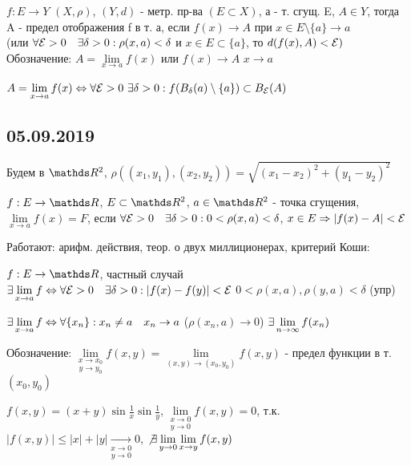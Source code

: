 \documentclass[11pt]{article}
\begin{document}
\begin{definition}
    $f:E \rightarrow Y$ $(X, \rho)$, $(Y,d)$ - метр. пр-ва $(E \subset X)$, а - т. сгущ. E, $A \in Y$, тогда A - предел отображения f в т. а, если $f(x) \rightarrow A$ при $x \in E \setminus \{a\}\rightarrow a$\\
    (или $\forall \mathcal{E}>0 \quad \exists \delta>0: \rho(x,a)<\delta$ и $x \in E \subset \{a\}$, то $d(f(x),A) < \mathcal{E})$\\
    Обозначение: $A=\lim\limits_{x \rightarrow a} f(x)$ или $f(x) \rightarrow A$ $x \rightarrow a$
\end{definition}

\begin{comments}
    $A=\lim\limits_{x \rightarrow a} f(x) \Leftrightarrow \forall \mathcal{E} > 0 \ \exists \delta>0: f(B_\delta(a) \setminus \{a\}) \subset B_{\mathcal{E}} (A)$
\end{comments}

\newpage
\subsection{05.09.2019}
Будем в $\R^2$, $\rho((x_1,y_1), (x_2,y_2)) = \sqrt{(x_1-x_2)^2 + (y_1-y_2)^2}$
\begin{definition}
    $f: E \rightarrow \R$, $E \subset \R^2$, $a \in \R^2$ - точка сгущения, $\lim\limits_{x \rightarrow a} f(x) = F$, если $\forall \mathcal{E}>0 \quad \exists \delta>0: 0<\rho(x,a)<\delta$, $x \in E \Rightarrow |f(x)-A|<\mathcal{E}$ 
\end{definition}

Работают: арифм. действия, теор. о двух миллиционерах, критерий Коши:
\begin{definition}
    $f: E \rightarrow \R$, частный случай $\exists \lim\limits_{x \rightarrow a} f \Leftrightarrow \forall \mathcal{E}>0 \quad \exists \delta > 0: |f(x)-f(y)|<\mathcal{E}$ $0<\rho(x,a), \rho(y,a)<\delta$ (упр)
\end{definition}

\begin{exercise}
    $\exists \lim\limits_{x \rightarrow a} f \Leftrightarrow \forall \{x_n\}: x_n \neq a \quad x_n \rightarrow a$ ($\rho(x_n,a) \rightarrow 0$) $\exists \lim\limits_{n \rightarrow \infty} f(x_n)$
\end{exercise}

Обозначение: $\underset{y \rightarrow y_0}{\lim\limits_{x \rightarrow x_0}} f(x,y) = \lim\limits_{(x,y) \rightarrow (x_0,y_0)} f(x,y)$ - предел функции в т. $(x_0,y_0)$

\begin{instance}
    $f(x,y)=(x+y)\sin \frac{1}{x} \sin \frac{1}{y}$, $\underset{y \rightarrow 0}{\lim\limits_{x \rightarrow 0}} f(x,y) = 0$, т.к.$|f(x,y)| \leqslant |x|+|y| \underset{y \rightarrow 0}{\underset{x \rightarrow 0}{\rightarrow}} 0$, $\not \exists \lim\limits_{y \rightarrow 0} \lim\limits_{x \rightarrow y} f(x,y)$
\end{instance}
\end{document}
